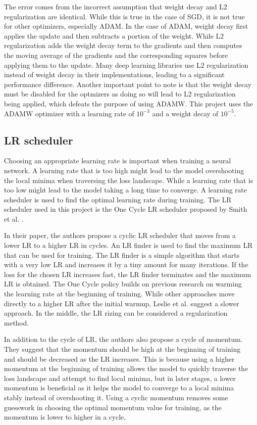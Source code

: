 \documentclass[a4paper,11pt,openright]{book}
\begin{document}
The error comes from the incorrect assumption that weight decay and L2 regularization are identical. While this is true in the case of SGD, it is not true for other optimizers, especially ADAM. In the case of ADAM, weight decay first applies the update and then subtracts a portion of the weight. While L2 regularization adds the weight decay term to the gradients and then computes the moving average of the gradients and the corresponding squares before applying them to the update. Many deep learning libraries use L2 regularization instead of weight decay in their implementations, leading to a significant performance difference. Another important point to note is that the weight decay must be disabled for the optmizers as doing so will lead to L2 regularization being applied, which defeats the purpose of using ADAMW.
This project uses the ADAMW optimizer with a learning rate of $10^{-3}$ and a weight decay of $10^{-5}$.

\subsection{LR scheduler}
Choosing an appropriate learning rate is important when training a neural network. A learning rate that is too high might lead to the model overshooting the local minima when traversing the loss landscape. While a learning rate that is too low might lead to the model taking a long time to converge. A learning rate scheduler is used to find the optimal learning rate during training. The LR scheduler used in this project is the One Cycle LR scheduler proposed by Smith et al. \cite{smithSuperConvergenceVeryFast2018}.

In their paper, the authors propose a cyclic LR scheduler that moves from a lower LR to a higher LR in cycles. An LR finder is used to find the maximum LR that can be used for training. The LR finder is a simple algorithm that starts with a very low LR and increases it by a tiny amount for many iterations. If the loss for the chosen LR increases fast, the LR finder terminates and the maximum LR is obtained. 
The One Cycle policy builds on previous research on warming the learning rate at the beginning of training. While other approaches move directly to a higher LR after the initial warmup, Leslie et al. suggest a slower approach. In the middle, the LR rizing can be considered a regularization method.

In addition to the cycle of LR, the authors also propose a cycle of momentum. They suggest that the momentum should be high at the beginning of training and should be decreased as the LR increases. This is because using a higher momentum at the beginning of training allows the model to quickly traverse the loss landscape and attempt to find local minima, but in later stages, a lower momentum is beneficial as it helps the model to converge to a local minima stably instead of overshooting it. Using a cyclic momentum removes some guesswork in choosing the optimal momentum value for training, as the momentum is lower to higher in a cycle. 
\end{document}
